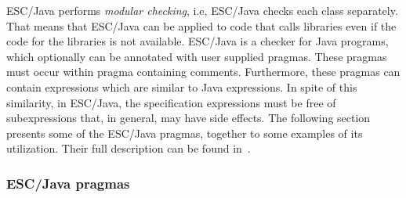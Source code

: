 \documentclass[a4paper]{llncs}
\begin{document}
ESC/Java performs \textit{modular checking}, i.e,
ESC/Java checks each class separately. That means that
ESC/Java can be applied to code that calls libraries even if
the code for the libraries is not available. ESC/Java is a
checker for Java programs, which optionally can be annotated
with user supplied pragmas. These pragmas must occur within pragma
containing comments. Furthermore, these pragmas can contain
expressions which are similar to Java expressions. In spite
of this similarity, in ESC/Java, the specification
expressions must be free of subexpressions that, in general, may have
side effects. The following section presents some of the
ESC/Java pragmas, together to some examples of its
utilization. Their full description can be found in~\cite{LeinoNS00}.

\subsubsection{\sc \bf ESC/Java pragmas}
\end{document}
